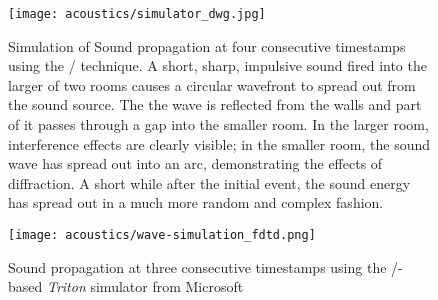 \begin{figure}[t]
    \begin{fullwidth}
        \centering
        \texttt{[image: acoustics/simulator\_dwg.jpg]}

        \caption{Simulation of Sound propagation at four consecutive timestamps using the \DWM/ technique.
        A short, sharp, impulsive sound fired into the larger of two rooms causes a circular wavefront to spread out from the sound source.
        The the wave is reflected from the walls and part of it passes through a gap into the smaller room.
        In the larger room, interference effects are clearly visible;
        in the smaller room, the sound wave has spread out into an arc, demonstrating the effects of diffraction.
        A short while after the initial event, the sound energy has spread out in a much more random and complex fashion.
        }
        \label{fig:acoustics:dwm}
    \end{fullwidth}

\end{figure}

\begin{figure}[t]

    \begin{fullwidth}
        \label{fig:acoustics:fdtd}
        \centering
        \texttt{[image: acoustics/wave-simulation\_fdtd.png]}

        \caption{Sound propagation at three consecutive timestamps using the \FDTD/-based \textit{Triton} simulator from Microsoft}
        \label{fig:acoustics:fdtd}

    \end{fullwidth}

\end{figure}

